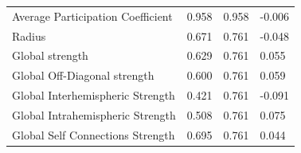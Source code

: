 \documentclass[11pt,conference]{IEEEtran}
\begin{document}
\begin{table}
\begin{center}
\begin{tabular}{p{4cm}p{1cm}p{1cm}p{1cm}}
                        Average Participation Coefficient &    0.958 &             0.958 &       -0.006 \\
                                                Radius &    0.671 &             0.761 &       -0.048 \\
                                        Global strength &    0.629 &             0.761 &        0.055 \\
                            Global Off-Diagonal strength &    0.600 &             0.761 &        0.059 \\
                        Global Interhemispheric Strength &    0.421 &             0.761 &       -0.091 \\
                        Global Intrahemispheric Strength &    0.508 &             0.761 &        0.075 \\
                        Global Self Connections Strength &    0.695 &             0.761 &        0.044 \\
                \bottomrule
            \end{tabular} 
            \label{group-diff-desikan}
        \end{center}
    \end{table}
    
\end{document}
